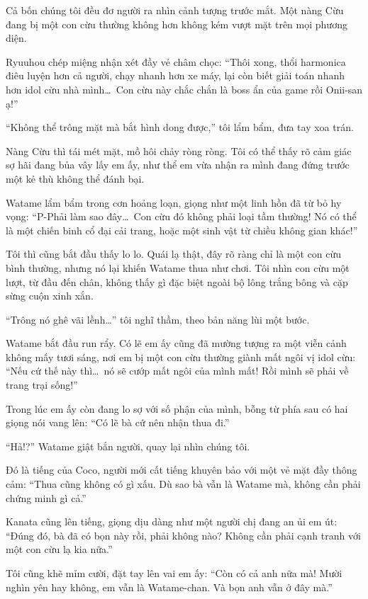 \documentclass[../main.tex]{subfiles}
\begin{document}
Cả bốn chúng tôi đều đơ người ra nhìn cảnh tượng trước mắt. Một nàng Cừu đang bị một con cừu thường không hơn không kém vượt mặt trên mọi phương diện.

Ryuuhou chép miệng nhận xét đầy vẻ châm chọc: ``Thôi xong, thổi harmonica điêu luyện hơn cả người, chạy nhanh hơn xe máy, lại còn biết giải toán nhanh hơn idol cừu nhà mình\dots\ Con cừu này chắc chắn là boss ẩn của game rồi Onii-san ạ!''

``Không thể trông mặt mà bắt hình dong được,'' tôi lẩm bẩm, đưa tay xoa trán.

Nàng Cừu thì tái mét mặt, mồ hôi chảy ròng ròng. Tôi có thể thấy rõ cảm giác sợ hãi đang bủa vây lấy em ấy, như thể em vừa nhận ra mình đang đứng trước một kẻ thù không thể đánh bại.

Watame lẩm bẩm trong cơn hoảng loạn, giọng như một linh hồn đã từ bỏ hy vọng: ``P-Phải làm sao đây\dots\ Con cừu đó không phải loại tầm thường! Nó có thể là một chiến binh cổ đại cải trang, hoặc một sinh vật từ chiều không gian khác!''

Tôi thì cũng bắt đầu thấy lo lo. Quái lạ thật, đây rõ ràng chỉ là một con cừu bình thường, nhưng nó lại khiến Watame thua như chơi. Tôi nhìn con cừu một lượt, từ đầu đến chân, không thấy gì đặc biệt ngoài bộ lông trắng bông và cặp sừng cuộn xinh xắn.

``Trông nó ghê vãi lềnh\dots''  tôi nghĩ thầm, theo bản năng lùi một bước.

Watame bắt đầu run rẩy. Có lẽ em ấy cũng đã mường tượng ra một viễn cảnh không mấy tươi sáng, nơi em bị một con cừu thường giành mất ngôi vị idol cừu: ``Nếu cứ thế này thì\dots\ nó sẽ cướp mất ngôi của mình mất! Rồi mình sẽ phải về trang trại sống!''

Trong lúc em ấy còn đang lo sợ với số phận của mình, bỗng từ phía sau có hai giọng nói vang lên: ``Có lẽ bà cứ nên nhận thua đi.''

``Hả!?'' Watame giật bắn người, quay lại nhìn chúng tôi.

Đó là tiếng của Coco, người mới cất tiếng khuyên bảo với một vẻ mặt đầy thông cảm: ``Thua cũng không có gì xấu. Dù sao bà vẫn là Watame mà, không cần phải chứng minh gì cả.''

Kanata cũng lên tiếng, giọng dịu dàng như một người chị đang an ủi em út: ``Đúng đó, bà đã có bọn này rồi, phải không nào? Không cần phải cạnh tranh với một con cừu lạ kia nữa.''

Tôi cũng khẽ mỉm cười, đặt tay lên vai em ấy: ``Còn có cả anh nữa mà! Mười nghìn yên hay không, em vẫn là Watame-chan. Và bọn anh vẫn ở đây mà.''
\end{document}
